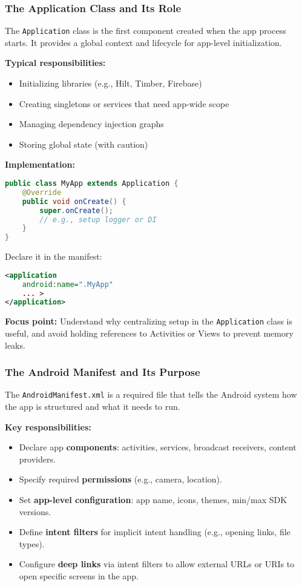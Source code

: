 \documentclass[a4paper,12pt]{article}
\begin{document}
\subsubsection{The Application Class and Its Role}

The \texttt{Application} class is the first component created when the app process starts. It provides a global context and lifecycle for app-level initialization.

\textbf{Typical responsibilities:}
\begin{itemize}
  \item Initializing libraries (e.g., Hilt, Timber, Firebase)
  \item Creating singletons or services that need app-wide scope
  \item Managing dependency injection graphs
  \item Storing global state (with caution)
\end{itemize}

\textbf{Implementation:}
\begin{lstlisting}[language=Java]
public class MyApp extends Application {
    @Override
    public void onCreate() {
        super.onCreate();
        // e.g., setup logger or DI
    }
}
\end{lstlisting}

Declare it in the manifest:
\begin{lstlisting}[language=xml]
<application
    android:name=".MyApp"
    ... >
</application>
\end{lstlisting}

\textbf{Focus point:} Understand why centralizing setup in the \texttt{Application} class is useful, and avoid holding references to Activities or Views to prevent memory leaks.

\subsubsection{The Android Manifest and Its Purpose}

The \texttt{AndroidManifest.xml} is a required file that tells the Android system how the app is structured and what it needs to run.

\textbf{Key responsibilities:}
\begin{itemize}
\item Declare app \textbf{components}: activities, services, broadcast receivers, content providers.
\item Specify required \textbf{permissions} (e.g., camera, location).
\item Set \textbf{app-level configuration}: app name, icons, themes, min/max SDK versions.
\item Define \textbf{intent filters} for implicit intent handling (e.g., opening links, file types).
\item Configure \textbf{deep links} via intent filters to allow external URLs or URIs to open specific screens in the app.
\end{itemize}
\end{document}
